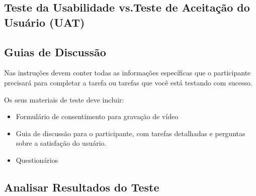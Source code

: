 \subsection{Teste da Usabilidade vs.Teste de Aceitação do Usuário (UAT)}


\subsection{Guias de Discussão}

Nas instruções devem conter todas as informações específicas que o participante precisará para completar a tarefa ou tarefas que você está testando com sucesso.

Os seus materiais de teste deve incluir:

\begin{itemize}
\item Formulário de consentimento para gravação de vídeo
\item Guia de discussão para o participante, com tarefas detalhadas e perguntas sobre a satisfação do usuário.
\item Questionários
\end{itemize}


\subsection{Analisar Resultados do Teste}













